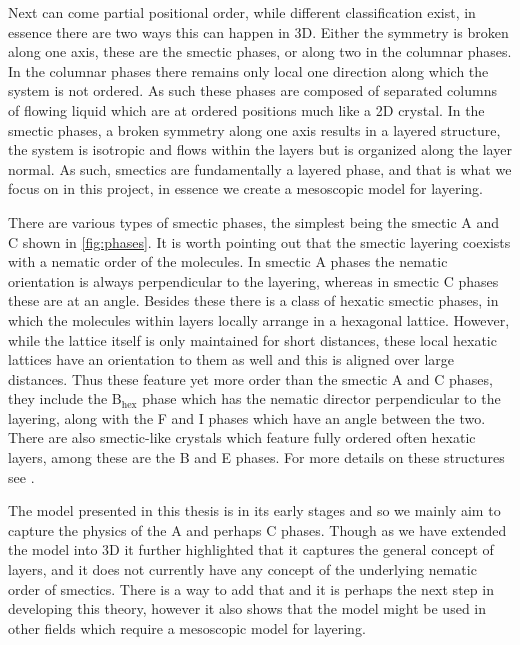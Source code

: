 \documentclass[12pt]{article}
\begin{document}
Next can come partial positional order, while different classification exist, in essence there are two ways this can happen in 3D.
Either the symmetry is broken along one axis, these are the smectic phases, or along two in the columnar phases\cite{oswaldNematicCholestericLiquid2005}.
In the columnar phases there remains only local one direction along which the system is not ordered.
As such these phases are composed of separated columns of flowing liquid which are at ordered positions much like a 2D crystal.
In the smectic phases, a broken symmetry along one axis results in a layered structure, the system is isotropic and flows within the layers but is organized along the layer normal.
As such, smectics are fundamentally a layered phase, and that is what we focus on in this project, in essence we create a mesoscopic model for layering.

There are various types of smectic phases, the simplest being the smectic A and C shown in \cref{fig:phases}.
It is worth pointing out that the smectic layering coexists with a nematic order of the molecules.
In smectic A phases the nematic orientation is always perpendicular to the layering, whereas in smectic C phases these are at an angle.
Besides these there is a class of hexatic smectic phases, in which the molecules within layers locally arrange in a hexagonal lattice.
However, while the lattice itself is only maintained for short distances, these local hexatic lattices have an orientation to them as well and this is aligned over large distances.
Thus these feature yet more order than the smectic A and C phases, they include the B$_\text{hex}$ phase which has the nematic director perpendicular to the layering, along with the F and I phases which have an angle between the two.
There are also smectic-like crystals which feature fully ordered often hexatic layers, among these are the B and E phases.
For more details on these structures see \cite{oswaldNematicCholestericLiquid2005,oswaldSmecticColumnarLiquid2005,gennesPhysicsLiquidCrystals1995}.


The model presented in this thesis is in its early stages and so we mainly aim to capture the physics of the A and perhaps C phases.
Though as we have extended the model into 3D it further highlighted that it captures the general concept of layers, and it does not currently have any concept of the underlying nematic order of smectics.
There is a way to add that and it is perhaps the next step in developing this theory, however it also shows that the model might be used in other fields which require a mesoscopic model for layering.
\end{document}
